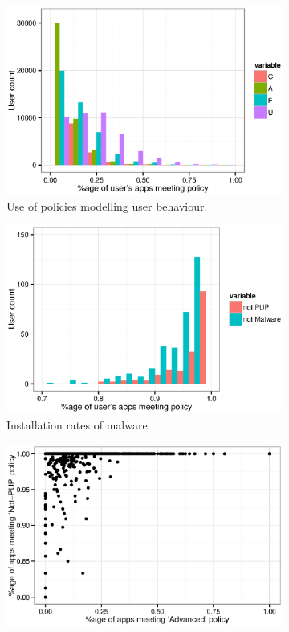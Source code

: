 \documentclass{scrartcl}
\begin{document}
\begin{figure}\centering
  \begin{subfigure}[b]{0.45\linewidth}\centering
    \includegraphics[width=\linewidth]{./images/lin-poster.eps}
    \caption{Use of policies modelling user behaviour.}
    \label{fig:lin}
  \end{subfigure}
  \begin{subfigure}[b]{0.45\linewidth}\centering
    \includegraphics[width=\linewidth]{./images/malware-poster.eps}
    \caption{Installation rates of malware.}
    \label{fig:malware}
  \end{subfigure}
  \begin{subfigure}[b]{0.45\linewidth}\centering
    \includegraphics[width=\linewidth]{./images/advanced-vs-malware.eps}

\end{subfigure}
\end{figure}
\end{document}
